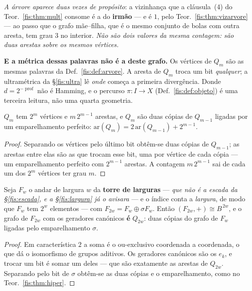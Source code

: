 \documentclass[livro.tex]{subfiles}
\begin{document}
\noindent\emph{A árvore aparece duas vezes de propósito}: a vizinhança que a
cláusula~(4) do Teor.~\ref{fis:thm:mult} consome é a do \textbf{irmão} --- e é
$1$, pelo Teor.~\ref{fis:thm:vizarvore} --- ao passo que o grafo mãe--filha, que
é o mesmo conjunto de bolas com outra aresta, tem grau $3$ no interior.
\emph{Não são dois valores da mesma contagem: são duas arestas sobre os mesmos
vértices.}

\medskip\noindent\textbf{E a métrica dessas palavras não é a deste grafo.} Os
vértices de $Q_m$ são as mesmas palavras da Def.~\ref{fis:def:arvore}. A aresta
de $Q_m$ troca um bit \emph{qualquer}; a ultramétrica da §\ref{fis:ultra} lê
\emph{onde} começa a primeira divergência. Donde $d=2^{-\operatorname{prof}}$
não é Hamming, e o percurso $\pi\colon I\to X$ (Def.~\ref{fis:def:objeto}) é
uma terceira leitura, não uma quarta geometria.

\begin{teorema}\label{fis:thm:hiper}$Q_m$ tem $2^m$ vértices e $m\,2^{m-1}$ arestas, e $Q_m$ são duas cópias de
$Q_{m-1}$ ligadas por um emparelhamento perfeito:
$\mathrm{ar}(Q_m)=2\,\mathrm{ar}(Q_{m-1})+2^{m-1}$.
\end{teorema}

\begin{proof}
Separando os vértices pelo último bit obtêm-se duas cópias de $Q_{m-1}$; as
arestas entre elas são as que trocam esse bit, uma por vértice de cada cópia ---
um emparelhamento perfeito com $2^{m-1}$ arestas. A contagem $m\,2^{m-1}$ sai de
cada um dos $2^m$ vértices ter grau $m$.
\end{proof}

\begin{teorema}\label{fis:thm:espaco}
Seja $F_w$ o andar de largura $w$ da \textbf{torre de larguras} --- \emph{que não é
a escada da §\ref{fis:escada}, e a §\ref{fis:largura} já o avisara} --- e o índice conta a \emph{largura},
de modo que $F_w$ tem $2^{w}$ elementos --- com $F_{2w}=F_w\oplus\sigma F_w$.
Então $(F_{2w},+)\cong B^{\,2w}$, e o grafo de $F_{2w}$ com os geradores canónicos
\textbf{é} $Q_{2w}$: duas cópias do grafo de $F_w$ ligadas pelo emparelhamento
$\sigma$.
\end{teorema}

\begin{proof}
Em característica $2$ a soma é o ou-exclusivo coordenada a coordenada, o que dá o
isomorfismo de grupos aditivos. Os geradores canónicos são os $e_k$, e trocar um
bit é somar um deles --- que são exatamente as arestas de $Q_{2w}$. Separando pelo
bit de $\sigma$ obtêm-se as duas cópias e o emparelhamento, como no
Teor.~\ref{fis:thm:hiper}.
\end{proof}
\end{document}
